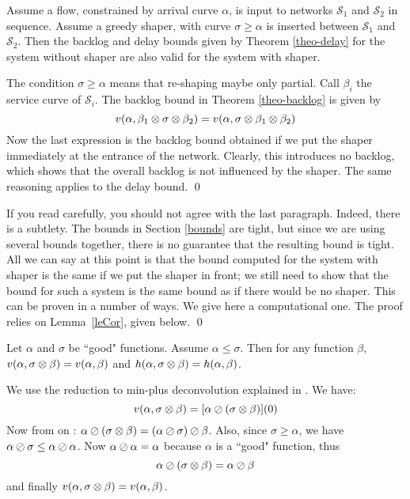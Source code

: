 \begin{theorem}
Assume a flow, constrained by arrival curve $\alpha$, is input to
networks $\mathcal{S}_{1}$ and $\mathcal{S}_{2}$ in sequence.
Assume a greedy shaper, with curve $\sigma \geq \alpha$ is
inserted between $\mathcal{S}_{1}$ and $\mathcal{S}_{2}$. Then the
backlog and delay bounds given by Theorem \ref{theo-delay} for the
system without shaper are also valid for the system with shaper.
\end{theorem}
The condition $\sigma \geq \alpha$ means that re-shaping maybe
only partial.
 \pr Call $\beta_{i}$ the service curve of
$\mathcal{S}_{i}$. The backlog bound in Theorem \ref{theo-backlog}
is given by
\begin{equation}\mylabel{eq-0599-a}
  v(\alpha, \beta_{1} \mpc \sigma \mpc \beta_{2}) = v(\alpha,
 \sigma \mpc \beta_{1}  \mpc \beta_{2})
\end{equation}
Now the last expression is the backlog bound obtained if we put
the shaper immediately at the entrance of the network. Clearly,
this introduces no backlog, which shows that the overall backlog
is not influenced by the shaper. The same reasoning applies to the
delay bound. \qed

If you read carefully, you should not agree with the last
paragraph.  Indeed, there is a subtlety. The bounds in Section
\ref{bounds} are tight, but since we are using several bounds
together, there is no guarantee that the resulting bound is tight.
All we can say at this point is that the bound computed for the
system with shaper is the same if we put the shaper in front; we
still need to show that the bound for such a system is the same
bound as if there would be no shaper. This can be proven in a
number of ways. We give here a computational one. The proof relies
on Lemma~\ref{leCor}, given below. \qed

\begin{lemma}
    Let $\alpha$ and $\sigma$ be ``good" functions. Assume $\alpha
    \leq \sigma$. Then for any
    function $\beta$,
    $v(\alpha, \sigma \otimes \beta)=v(\alpha,\beta)$
    and
    $h(\alpha, \sigma \otimes \beta)=h(\alpha,\beta)$.
\end{lemma}
\pr
We use the reduction to min-plus deconvolution explained in
. We have:
$$v(\alpha, \sigma \otimes \beta)= [\alpha \oslash (\sigma \otimes
\beta)](0)
$$
Now from  on : $\alpha
\oslash (\sigma \otimes \beta)= (\alpha \oslash \sigma) \oslash \beta$. Also,
since $\sigma \geq \alpha$, we have $\alpha \oslash \sigma \leq
\alpha \oslash \alpha$. Now $\alpha \oslash \alpha=\alpha$ because
$\alpha$ is a ``good" function, thus
\begin{equation}\mylabel{eq-demolecor}
  \alpha \mpd (\sigma \mpc \beta)= \alpha \mpd \beta
\end{equation}
and finally $v(\alpha, \sigma \otimes \beta) = v(\alpha, \beta)$.

